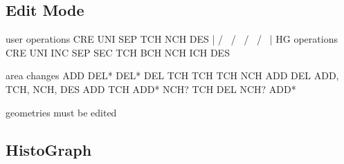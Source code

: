 


\subsection{Edit Mode} %
\label{sub:edit_mode}


user operations     CRE     UNI          SEP         TCH         NCH      DES
                     |      / \         /   \        /  \       /   \      |
HG operations       CRE   UNI   INC   SEP   SEC   TCH   BCH   NCH   ICH   DES

area changes        ADD   DEL*  DEL*  DEL   TCH   TCH   TCH   NCH   ADD   DEL
ADD, TCH, NCH, DES        ADD   TCH   ADD*  NCH?        TCH         DEL
                                NCH?        ADD*


geometries must be edited




\subsection{HistoGraph} %
\label{sub:histograph}





